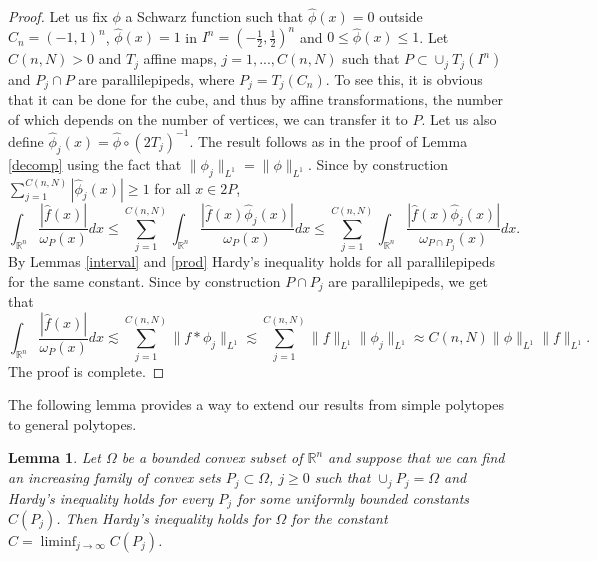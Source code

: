\documentclass[footinclude=true]{amsart}
\theoremstyle{plain}
\newtheorem{lm}[theo]{Lemma}
\begin{document}
\begin{proof}
	Let us fix $\phi$ a Schwarz function such that $\widehat{\phi}(x)=0$ outside $C_n=(-1,1)^{n}$, $\widehat{\phi}(x)=1$ in $I^n=(-\frac{1}{2},\frac{1}{2})^{n}$ and $0\leq \widehat{\phi}(x)\leq 1$. Let $C(n,N)>0$ and $T_j$ affine maps, $j=1,...,C(n,N)$ such that $P\subset \cup_j T_j(I^n)$ and $P_j\cap P$ are parallilepipeds, where $P_j=T_j(C_n)$. To see this, it is obvious that it can be done for the cube, and thus by affine transformations, the number of which depends on the number of vertices, we can transfer it to $P$. Let us also define  $\widehat{\phi}_j(x)=\widehat{\phi}\circ (2T_j)^{-1}$. The result follows as in the proof of Lemma \ref{decomp} using the fact that $\|\phi_j\|_{L^{1}}=\|\phi\|_{L^{1}}$. Since by construction $\sum_{j=1}^{C(n,N)}|\widehat{\phi}_j(x)|\geq 1$ for all $x\in 2P$, 
	$$\int_{\mathbb{R}^{n}}\dfrac{|\widehat{f}(x)|}{\omega_{P}(x)}dx\leq \sum_{j=1}^{C(n,N)}\int_{\mathbb{R}^{n}}\dfrac{|\widehat{f}(x)\widehat{\phi}_j(x)|}{\omega_{P}(x)}dx\leq \sum_{j=1}^{C(n,N)}\int_{\mathbb{R}^{n}}\dfrac{|\widehat{f}(x)\widehat{\phi}_j(x)|}{\omega_{P\cap P_j}(x)}dx.$$
	By Lemmas \ref{interval} and \ref{prod} Hardy's inequality holds for all parallilepipeds for the same constant. Since by construction $P\cap P_j$ are parallilepipeds, we get that
	$$\int_{\mathbb{R}^{n}}\dfrac{|\widehat{f}(x)|}{\omega_{P}(x)}dx\lesssim \sum_{j=1}^{C(n,N)} \|f\ast\phi_j\|_{L^{1}}\lesssim \sum_{j=1}^{C(n,N)} \|f\|_{L^1}\|\phi_j\|_{L^{1}} \approx C(n,N)\|\phi\|_{L^{1}} \|f\|_{L^1}.$$
The proof is complete.
\end{proof}
The following lemma provides a way to extend our results from simple polytopes to general polytopes.
\begin{lm}\label{approxim}
	Let $\Omega$ be a bounded convex subset of $\mathbb{R}^{n}$ and suppose that we can find an increasing family of convex sets $P_j\subset \Omega$, $j\geq 0$ such that $\cup_j P_j=\Omega$ and Hardy's inequality holds for every $P_j$ for some uniformly bounded constants $C(P_j)$. Then Hardy's inequality holds for $\Omega$ for the constant $C=\liminf_{j\to \infty}C(P_j)$.
\end{lm}
\end{document}
